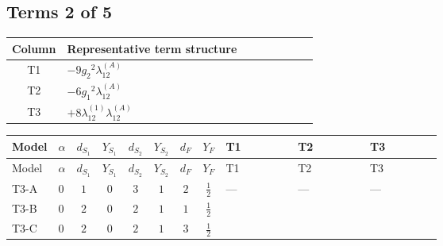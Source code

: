 \documentclass[8pt]{article}
\begin{document}
\begin{landscape}
\subsection*{Terms 2 of 5}
\begin{center}
\begin{tabular}{@{}c >{\raggedright\arraybackslash}p{0.82\linewidth}@{}}
\toprule
Column & Representative term structure \\
\midrule
T1 & \(\displaystyle -9 {g_2}^2 {\lambda_{12}^{(A)}}\) \\
\midrule
T2 & \(\displaystyle -6 {g_1}^2 {\lambda_{12}^{(A)}}\) \\
\midrule
T3 & \(\displaystyle +8 {\lambda_{12}^{(1)}} {\lambda_{12}^{(A)}}\) \\
\midrule
\bottomrule
\end{tabular}
\end{center}
\smallskip
\tiny
\begin{longtable}{@{}llcccccc >{\raggedright\arraybackslash}p{0.21\linewidth} >{\raggedright\arraybackslash}p{0.21\linewidth} >{\raggedright\arraybackslash}p{0.21\linewidth}@{}}
\toprule
Model & $\alpha$ & $d_{S_1}$ & $Y_{S_1}$ & $d_{S_2}$ & $Y_{S_2}$ & $d_F$ & $Y_F$ & T1 & T2 & T3 \\
\midrule
\endfirsthead
\toprule
Model & $\alpha$ & $d_{S_1}$ & $Y_{S_1}$ & $d_{S_2}$ & $Y_{S_2}$ & $d_F$ & $Y_F$ & T1 & T2 & T3 \\
\midrule
\endhead
T3-A & $0$ & $1$ & $0$ & $3$ & $1$ & $2$ & $\frac{1}{2}$ & --- & --- & --- \\
\midrule
T3-B & $0$ & $2$ & $0$ & $2$ & $1$ & $1$ & $\frac{1}{2}$ & \scriptsize\adjustbox{max width=\linewidth}{$\begin{gathered} -9 {g_2}^2 {\lambda_{12}^{(A)}}\end{gathered}$} & \scriptsize\adjustbox{max width=\linewidth}{$\begin{gathered} -6 {g_1}^2 {\lambda_{12}^{(A)}}\end{gathered}$} & \scriptsize\adjustbox{max width=\linewidth}{$\begin{gathered} +8 {\lambda_{12}^{(1)}} {\lambda_{12}^{(A)}}\end{gathered}$} \\
\midrule
T3-C & $0$ & $2$ & $0$ & $2$ & $1$ & $3$ & $\frac{1}{2}$ & \scriptsize\adjustbox{max width=\linewidth}{$\begin{gathered} -9 {g_2}^2 {\lambda_{12}^{(A)}}\end{gathered}$} & \scriptsize\adjustbox{max width=\linewidth}{$\begin{gathered} -6 {g_1}^2 {\lambda_{12}^{(A)}}\end{gathered}$} & \scriptsize\adjustbox{max width=\linewidth}{$\begin{gathered} +8 {\lambda_{12}^{(1)}} {\lambda_{12}^{(A)}}\end{gathered}$} \\

\end{longtable}
\end{landscape}
\end{document}
